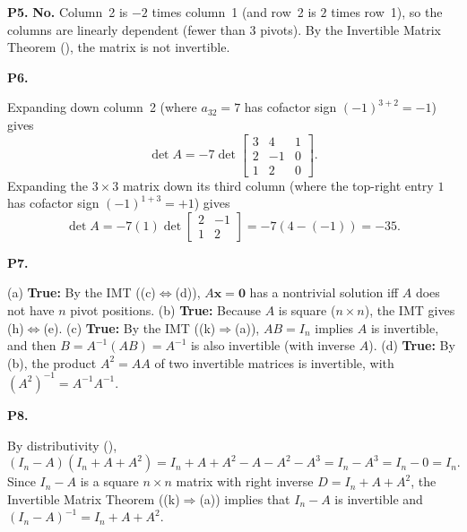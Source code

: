 \documentclass[10pt]{scrartcl}
\newcommand{\vv}[1]{\mathbf{#1}}
\begin{document}
\begin{prob}\textbf{P5.}
\textbf{No.} Column~2 is $-2$ times column~1 (and row~2 is $2$ times row~1), so the columns are linearly dependent (fewer than $3$ pivots). By the Invertible Matrix Theorem (), the matrix is not invertible.
\end{prob}

\begin{prob}\textbf{P6.}\par{}
\begin{steps}
  \ii Expanding down column~2 (where $a_{32}=7$ has cofactor sign $(-1)^{3+2}=-1$) gives
  \[
    \det A = -7\det\begin{bmatrix} 3 & 4 & 1 \\ 2 & -1 & 0 \\ 1 & 2 & 0 \end{bmatrix}.
  \]
  \ii Expanding the $3\times 3$ matrix down its third column (where the top-right entry $1$ has cofactor sign $(-1)^{1+3}=+1$) gives
  \[
    \det A = -7(1)\det\begin{bmatrix} 2 & -1 \\ 1 & 2 \end{bmatrix} = -7(4 - (-1)) = -35.
  \]
\end{steps}
\end{prob}

\begin{prob}\textbf{P7.}
\begin{steps}
  \ii (a) \textbf{True:} By the IMT ((c)$\iff$(d)), $A\vv x=\vv 0$ has a nontrivial solution iff $A$ does not have $n$ pivot positions.
  \ii (b) \textbf{True:} Because $A$ is square ($n\times n$), the IMT gives (h)$\iff$(e).
  \ii (c) \textbf{True:} By the IMT ((k)$\Rightarrow$(a)), $AB=I_n$ implies $A$ is invertible, and then $B=A^{-1}(AB)=A^{-1}$ is also invertible (with inverse $A$).
  \ii (d) \textbf{True:} By (b), the product $A^2=AA$ of two invertible matrices is invertible, with $(A^2)^{-1}=A^{-1}A^{-1}$.
\end{steps}
\end{prob}

\begin{prob}\textbf{P8.}\par{}
By distributivity (),
\[
  (I_n - A)(I_n + A + A^2) = I_n + A + A^2 - A - A^2 - A^3 = I_n - A^3 = I_n - 0 = I_n.
\]
Since $I_n-A$ is a square $n\times n$ matrix with right inverse $D=I_n+A+A^2$, the Invertible Matrix Theorem ((k)$\Rightarrow$(a)) implies that $I_n-A$ is invertible and $(I_n-A)^{-1}=I_n+A+A^2$.
\end{prob}
\end{document}
